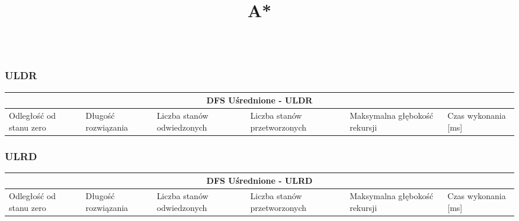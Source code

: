 \documentclass{classrep}
\begin{document}
{\begin{center}
\begin{tabular}{ | p{1.6cm} | p{1.4cm} | p{1.8cm} | p{2cm} | p{2.2cm} | p{2cm} | }
	\hline
	\end{tabular}
\end{center}

\subsubsection{ULDR}
\begin{center}
	\begin{tabular}{ | p{1.6cm} | p{1.4cm} | p{1.8cm} | p{2cm} | p{2.2cm} | p{2cm} | }
	\hline
	\multicolumn{6}{|c|}{DFS Uśrednione - ULDR} \\
	\hline
	Odległość od stanu zero & Długość rozwiązania & Liczba stanów odwiedzonych & Liczba stanów przetworzonych & Maksymalna głębokość rekursji & Czas wykonania [ms]\\
	\hline
	
	\hline
	\end{tabular}
\end{center}

\subsubsection{ULRD}
\begin{center}
	\begin{tabular}{ | p{1.6cm} | p{1.4cm} | p{1.8cm} | p{2cm} | p{2.2cm} | p{2cm} | }
	\hline
	\multicolumn{6}{|c|}{DFS Uśrednione - ULRD} \\
	\hline
	Odległość od stanu zero & Długość rozwiązania & Liczba stanów odwiedzonych & Liczba stanów przetworzonych & Maksymalna głębokość rekursji & Czas wykonania [ms]\\
	\hline
	
	\hline
	\end{tabular}
\end{center}

\begin{center}
	\title{\textbf{A*}}
\end{center}

}
\end{document}
